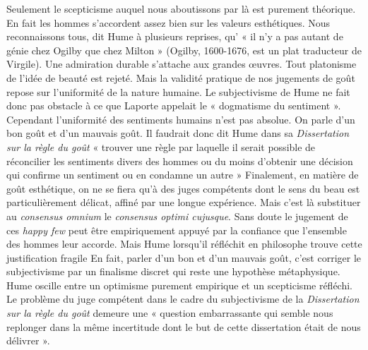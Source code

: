 Seulement le scepticisme auquel nous aboutissons par là
est purement théorique. En fait les hommes s’accordent
assez bien sur les valeurs esthétiques. Nous reconnaissons
tous, dit Hume à plusieurs reprises, qu’ « il n’y a pas
autant de génie chez Ogilby que chez Milton » (Ogilby,
1600-1676, est un plat traducteur de Virgile). Une admiration durable 
s’attache aux grandes œuvres. Tout platonisme de l’idée de beauté est rejeté.
Mais la validité pratique de nos jugements de goût repose sur l’uniformité
de la nature humaine. Le subjectivisme de Hume ne fait
donc pas obstacle à ce que Laporte appelait le « dogmatisme
du sentiment ». Cependant l’uniformité des sentiments
humains n’est pas absolue. On parle d’un bon goût et
d'un mauvais goût. Il faudrait donc dit Hume dans sa
{\it Dissertation sur la règle du goût} « trouver une règle par
laquelle il serait possible de réconcilier les sentiments
divers des hommes ou du moins d’obtenir une décision
qui confirme un sentiment ou en condamne un autre »
Finalement, en matière de goût esthétique, on ne se fiera
qu’à des juges compétents dont le sens du beau est particulièrement 
délicat, affiné par une longue expérience.
Mais c’est là substituer au {\it consensus omnium} le {\it consensus
optimi cujusque}. Sans doute le jugement de ces {\it happy few}
peut être empiriquement appuyé par la confiance que
l’ensemble des hommes leur accorde. Mais Hume lorsqu’il
réfléchit en philosophe trouve cette justification fragile
En fait, parler d’un bon et d’un mauvais goût, c’est corriger
le subjectivisme par un finalisme discret qui reste une
hypothèse métaphysique. Hume oscille entre un optimisme
purement empirique et un scepticisme réfléchi. Le problème 
du juge compétent dans le cadre du subjectivisme
de la {\it Dissertation sur la règle du goût} demeure une « question
embarrassante qui semble nous replonger dans la même
incertitude dont le but de cette dissertation était de nous
délivrer ».

